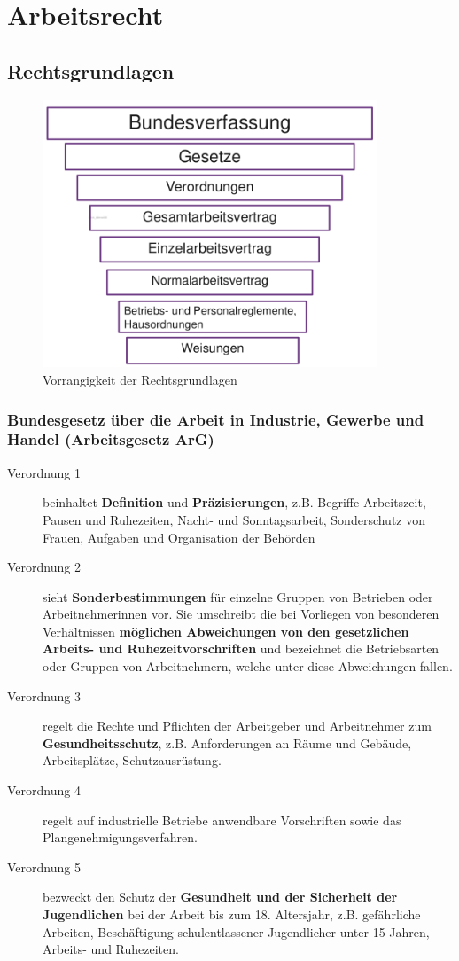 \chapter{Arbeitsrecht}

\section{Rechtsgrundlagen}

\begin{figure}[h]
  \centering
  \includegraphics[width=10cm]{res/arbeitsrecht-vorrangigkeit.png}
  \caption{Vorrangigkeit der Rechtsgrundlagen}
\end{figure}

\subsection{Bundesgesetz über die Arbeit in Industrie, Gewerbe und Handel (Arbeitsgesetz ArG)}

\begin{description}
  \item[Verordnung 1] beinhaltet \textbf{Definition} und \textbf{Präzisierungen}, z.B. Begriffe Arbeitszeit, Pausen und Ruhezeiten, Nacht- und Sonntagsarbeit, Sonderschutz von Frauen, Aufgaben und Organisation der Behörden
  \item[Verordnung 2] sieht \textbf{Sonderbestimmungen} für einzelne Gruppen von Betrieben oder Arbeitnehmerinnen vor. Sie umschreibt die bei Vorliegen von besonderen Verhältnissen \textbf{möglichen Abweichungen von den gesetzlichen Arbeits- und Ruhezeitvorschriften} und bezeichnet die Betriebsarten oder Gruppen von Arbeitnehmern, welche unter diese Abweichungen fallen.
  \item[Verordnung 3] regelt die Rechte und Pflichten der Arbeitgeber und Arbeitnehmer zum \textbf{Gesundheitsschutz}, z.B. Anforderungen an Räume und Gebäude, Arbeitsplätze, Schutzausrüstung.
  \item[Verordnung 4] regelt auf industrielle Betriebe anwendbare Vorschriften sowie das Plangenehmigungsverfahren.
  \item[Verordnung 5] bezweckt den Schutz der \textbf{Gesundheit und der Sicherheit der Jugendlichen} bei der Arbeit bis zum 18. Altersjahr, z.B. gefährliche Arbeiten, Beschäftigung schulentlassener Jugendlicher unter 15 Jahren, Arbeits- und Ruhezeiten.
\end{description}

